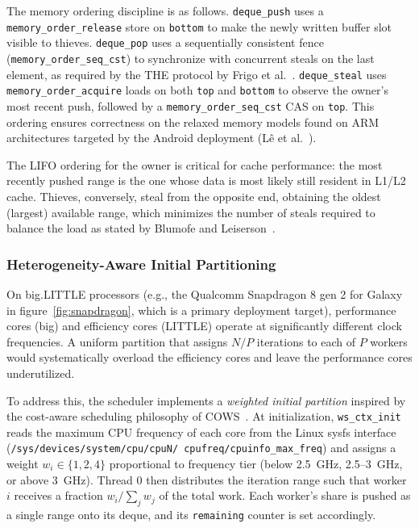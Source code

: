 \documentclass[11pt,english]{article}
\begin{document}
The memory ordering discipline is as follows. \texttt{deque\_push} uses a \texttt{memory\_order\_release} store on \texttt{bottom} to make the newly written buffer slot visible to thieves. \texttt{deque\_pop} uses a sequentially consistent fence (\texttt{memory\_order\_seq\_cst}) to synchronize with concurrent steals on the last element, as required by the THE protocol by Frigo et al.~\cite[Ref.~2]{yanghe2018survey}. \texttt{deque\_steal} uses \texttt{memory\_order\_acquire} loads on both \texttt{top} and \texttt{bottom} to observe the owner's most recent push, followed by a \texttt{memory\_order\_seq\_cst} CAS on \texttt{top}. This ordering ensures correctness on the relaxed memory models found on ARM architectures targeted by the Android deployment (Lê et al.~\cite[Ref.~55]{yanghe2018survey}).
 
The LIFO ordering for the owner is critical for cache performance: the most recently pushed range is the one whose data is most likely still resident in L1/L2 cache. Thieves, conversely, steal from the opposite end, obtaining the oldest (largest) available range, which minimizes the number of steals required to balance the load as stated by Blumofe and Leiserson~\cite{blumofe1999workstealing}.
 
\subsubsection{Heterogeneity-Aware Initial Partitioning}
 
On big.LITTLE processors (e.g., the Qualcomm Snapdragon 8 gen 2 for Galaxy in figure~\ref{fig:snapdragon}, which is a primary deployment target), performance cores (big) and efficiency cores (LITTLE) operate at significantly different clock frequencies. A uniform partition that assigns $N/P$ iterations to each of $P$ workers would systematically overload the efficiency cores and leave the performance cores underutilized.
 
To address this, the scheduler implements a \emph{weighted initial partition} inspired by the cost-aware scheduling philosophy of COWS~\cite{mishra2024cows}. At initialization, \texttt{ws\_ctx\_init} reads the maximum CPU frequency of each core from the Linux sysfs interface (\texttt{/sys/devices/system/cpu/cpuN/
cpufreq/cpuinfo\_max\_freq}) and assigns a weight $w_i \in \{1, 2, 4\}$ proportional to frequency tier (below 2.5~GHz, 2.5--3~GHz, or above 3~GHz). Thread 0 then distributes the iteration range such that worker $i$ receives a fraction $w_i / \sum_j w_j$ of the total work. Each worker's share is pushed as a single range onto its deque, and its \texttt{remaining} counter is set accordingly.
 
\end{document}
